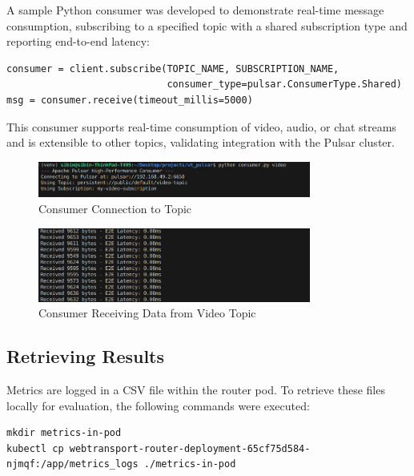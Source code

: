 A sample Python consumer was developed to demonstrate real-time message consumption, subscribing to a specified topic with a shared subscription type and reporting end-to-end latency:

\begin{lstlisting}[breaklines=true,basicstyle=\small\ttfamily,frame=single]
consumer = client.subscribe(TOPIC_NAME, SUBSCRIPTION_NAME,
                            consumer_type=pulsar.ConsumerType.Shared)
msg = consumer.receive(timeout_millis=5000)
\end{lstlisting}

This consumer supports real-time consumption of video, audio, or chat streams and is extensible to other topics, validating integration with the Pulsar cluster.

\begin{figure}[h!]
    \centering
    \includegraphics[width=0.8\textwidth]{implementation/consumer-video.png}
    \caption{Consumer Connection to Topic}
    \label{fig:consumer-conn}
\end{figure}

\begin{figure}[h!]
    \centering
    \includegraphics[width=0.8\textwidth]{implementation/pulsar-consumer-video.png}
    \caption{Consumer Receiving Data from Video Topic}
    \label{fig:consumer-data}
\end{figure}

\subsection{Retrieving Results}
Metrics are logged in a CSV file within the router pod. To retrieve these files locally for evaluation, the following commands were executed:

\begin{lstlisting}[breaklines=true,basicstyle=\small\ttfamily,frame=single]
mkdir metrics-in-pod
kubectl cp webtransport-router-deployment-65cf75d584-njmqf:/app/metrics_logs ./metrics-in-pod
\end{lstlisting}

